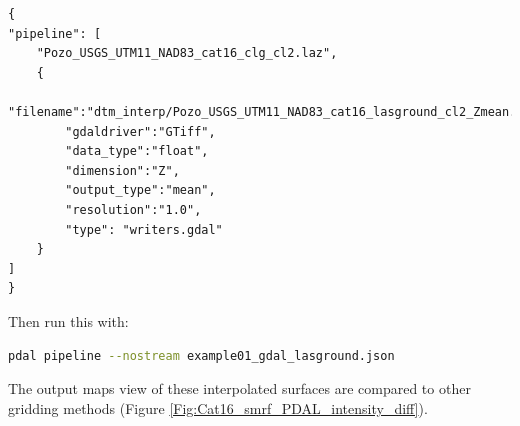 \documentclass[a4paperpaper,,tablecaptionabove]{scrartcl}
\begin{document}
\begin{lstlisting}
{
"pipeline": [
    "Pozo_USGS_UTM11_NAD83_cat16_clg_cl2.laz",
    {
        "filename":"dtm_interp/Pozo_USGS_UTM11_NAD83_cat16_lasground_cl2_Zmean.tif",
        "gdaldriver":"GTiff",
        "data_type":"float",
        "dimension":"Z",
        "output_type":"mean",
        "resolution":"1.0",
        "type": "writers.gdal"
    }
]
}
\end{lstlisting}

Then run this with:

\begin{lstlisting}[language=bash]
pdal pipeline --nostream example01_gdal_lasground.json
\end{lstlisting}

The output maps view of these interpolated surfaces are compared to
other gridding methods (Figure
\ref{Fig:Cat16_smrf_PDAL_intensity_diff}).
\end{document}
